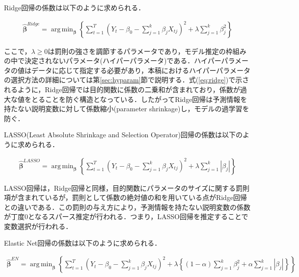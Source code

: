 \documentclass[a4paper，11pt]{jsarticle}
\DeclareMathOperator*{\argmin}{arg\,min}
\begin{document}
Ridge回帰の係数は以下のように求められる．

\begin{equation} \label{eq:ridge}
  \begin{split}
    \hat{\bm{\beta}}^{Ridge} = \argmin_{\bm{\beta}}\left\{ \sum_{t=1}^{T} \left( Y_t - \beta_0 - \sum_{j=1}^{k} \beta_{j} X_{tj} \right)^2 + \lambda \sum_{j=1}^{k} \beta_{j}^{2} \right\}
  \end{split}
\end{equation}

ここで，$\lambda \geq 0$は罰則の強さを調節するパラメータであり，モデル推定の枠組みの中で決定されないパラメータ(ハイパーパラメータ)である．ハイパーパラメータの値はデータに応じて指定する必要があり，本稿におけるハイパーパラメータの選択方法の詳細については第\ref{sec:hyparam}節で説明する．式(\ref{eq:ridge})で示されるように，Ridge回帰では目的関数に係数の二乗和が含まれており，係数が過大な値をとることを防ぐ構造となっている．したがってRidge回帰は予測情報を持たない説明変数に対して係数縮小(parameter shrinkage)し，モデルの過学習を防ぐ．

LASSO(Least Absolute Shrinkage and Selection Operator)回帰の係数は以下のように求められる．

\begin{equation} \label{eq:lasso}
  \begin{split}
    \hat{\bm{\beta}}^{LASSO} = \argmin_{\bm{\beta}}\left\{ \sum_{t=1}^{T} \left( Y_t - \beta_0 - \sum_{j=1}^{k} \beta_{j} X_{tj} \right)^2 + \lambda \sum_{j=1}^{k} \left|\beta_{j}\right| \right\}
  \end{split}
\end{equation}

LASSO回帰は，Ridge回帰と同様，目的関数にパラメータのサイズに関する罰則項が含まれているが，罰則として係数の絶対値の和を用いている点がRidge回帰との違いである．この罰則の与え方により，予測情報を持たない説明変数の係数が丁度0となるスパース推定が行われる．つまり，LASSO回帰を推定することで変数選択が行われる．

Elastic Net回帰の係数は以下のように求められる．

\begin{equation}
  \begin{split}
    \hat{\bm{\beta}}^{EN} = \argmin_{\bm{\beta}}\left\{ \sum_{t=1}^{T} \left( Y_t - \beta_0 - \sum_{j=1}^{k} \beta_{j} X_{tj} \right)^2 + 
    \lambda \left\{ 
      \left( 1 - \alpha \right) \sum_{j=1}^{k} \beta_{j}^2 + 
      \alpha \sum_{j=1}^{k} \left|\beta_{j}\right| 
      \right\} 
    \right\}
  \end{split}
\end{equation}
\end{document}
